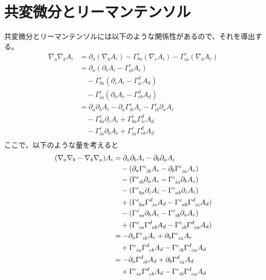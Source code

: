 \documentclass[dvipdfmx]{report} %
\begin{document}
\section{
	共変微分とリーマンテンソル
}
共変微分とリーマンテンソルには以下のような関係性があるので、それを導出する。\\
\begin{equation*}
\begin{split}
	\nabla_a \nabla_b A_i &= \partial_a ( \nabla_b A_i ) - \Gamma^c_{ba}( \nabla_c A_i ) - \Gamma^c_{ia}( \nabla_b A_c ) \\
	&= \partial_a ( \partial_b A_i - \Gamma^c_{ib} A_c ) \\
	&\quad - \Gamma^c_{ba}( \partial_c A_i - \Gamma^d_{ic} A_d ) \\
	&\quad - \Gamma^c_{ia}( \partial_b A_c - \Gamma^d_{cb} A_d ) \\
	&= \partial_a \partial_b A_i - \partial_a \Gamma^c_{ib} A_c - \Gamma^c_{ib} \partial_a A_c \\
	&\quad - \Gamma^c_{ba} \partial_c A_i + \Gamma^c_{ba} \Gamma^d_{ic} A_d \\
	&\quad - \Gamma^c_{ia} \partial_b A_c + \Gamma^c_{ia} \Gamma^d_{cb} A_d \\
\end{split}
\end{equation*}
ここで、以下のような量を考えると
\begin{equation*}
\begin{split}
	( \nabla_a \nabla_b - \nabla_b \nabla_a )A_i 
	&= \partial_a \partial_b A_i - \partial_b \partial_a A_i \\
	&\quad - ( \partial_a \tensor{\Gamma}{^c_{ib}} A_c - \partial_b \tensor{\Gamma}{^c_{ia}} A_c ) \\
	&\quad - ( \tensor{\Gamma}{^c_{ib}} \partial_a A_c - \tensor{\Gamma}{^c_{ia}} \partial_b A_c )\\
	&\quad - ( \tensor{\Gamma}{^c_{ba}} \partial_c A_i - \tensor{\Gamma}{^c_{ab}} \partial_c A_i ) \\
	&\quad + ( \tensor{\Gamma}{^c_{ba}} \tensor{\Gamma}{^d_{ic}} A_d - \tensor{\Gamma}{^c_{ab}} \tensor{\Gamma}{^d_{ic}} A_d )\\
	&\quad - ( \tensor{\Gamma}{^c_{ia}} \partial_b A_c - \tensor{\Gamma}{^c_{ib}} \partial_a A_c ) \\
	&\quad + ( \tensor{\Gamma}{^c_{ia}} \tensor{\Gamma}{^d_{cb}} A_d - \tensor{\Gamma}{^c_{ib}} \tensor{\Gamma}{^d_{ca}} A_d ) \\
	&= - \partial_a \tensor{\Gamma}{^c_{ib}} A_c + \partial_b \tensor{\Gamma}{^c_{ia}} A_c \\
	&\quad + \tensor{\Gamma}{^c_{ia}} \tensor{\Gamma}{^d_{cb}} A_d - \tensor{\Gamma}{^c_{ib}} \tensor{\Gamma}{^d_{ca}} A_d \\
	&= - \partial_a \tensor{\Gamma}{^d_{ib}} A_d + \partial_b \tensor{\Gamma}{^d_{ia}} A_d \\
	&\quad + \tensor{\Gamma}{^c_{ia}} \tensor{\Gamma}{^d_{cb}} A_d - \tensor{\Gamma}{^c_{ib}} \tensor{\Gamma}{^d_{ca}} A_d \\
\end{split}
\end{equation*}\noindent
\end{document}
